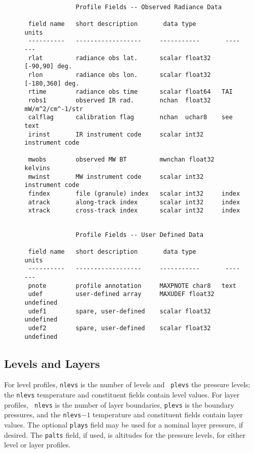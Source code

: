 \documentclass[12pt]{article}
\begin{document}
\begin{figure}
{\small
\begin{verbatim}

              Profile Fields -- Observed Radiance Data
  
 field name   short description       data type         units
 ----------   ------------------     -----------       -------
 rlat         radiance obs lat.      scalar float32   [-90,90] deg.
 rlon         radiance obs lon.      scalar float32   [-180,360] deg. 
 rtime        radiance obs time      scalar float64   TAI
 robs1        observed IR rad.       nchan  float32   mW/m^2/cm^-1/str
 calflag      calibration flag       nchan  uchar8    see text
 irinst       IR instrument code     scalar int32     instrument code

 mwobs        observed MW BT         mwnchan float32  kelvins
 mwinst       MW instrument code     scalar int32     instrument code
 findex       file (granule) index   scalar int32     index
 atrack       along-track index      scalar int32     index
 xtrack       cross-track index      scalar int32     index

\end{verbatim}
}
\end{figure}
\begin{figure}
{\small
\begin{verbatim}

              Profile Fields -- User Defined Data
  
 field name   short description       data type         units
 ----------   ------------------     -----------       -------
 pnote        profile annotation     MAXPNOTE char8   text
 udef         user-defined array     MAXUDEF float32  undefined
 udef1        spare, user-defined    scalar float32   undefined
 udef2        spare, user-defined    scalar float32   undefined

\end{verbatim}
}
\end{figure}

\subsection{Levels and Layers}

For level profiles, {\tt nlevs} is the number of levels and {\tt
plevs} the pressure levels; the {\tt nlevs} temperature and
constituent fields contain level values.  For layer profiles, {\tt
nlevs} is the number of layer boundaries, {\tt plevs} is the
boundary pressures, and the {\tt nlevs}$ - 1$ temperature and
constituent fields contain layer values.  The optional {\tt plays}
field may be used for a nominal layer pressure, if desired.  The
{\tt palts} field, if used, is altitudes for the pressure levels,
for either level or layer profiles.
\end{document}

